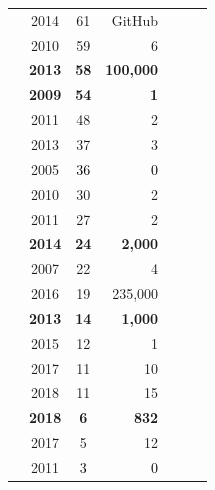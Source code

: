 \documentclass[sigconf,review]{acmart}
\newcommand{\cmark}{\ding{51}}%
\newcommand{\xmark}{\ding{55}}%
\begin{document}
\begin{table}
\begin{tabular}{r|@{~}c|@{~}c|@{~}r|@{~}c|@{~}c|@{~}c}
        \cite{lima2014coding} & 2014 &	61 & GitHub  & \xmark & \xmark & \cmark \\
        \cite{Ostrand:2010:PFP:1868328.1868357} & 2010 &	59 &	6  & \xmark & \cmark & \cmark \\
        \rowcolor{blue!10} \textbf{\cite{bissyande2013got}} & \textbf{2013} &	\textbf{58} & \textbf{100,000} & \cmark & \cmark & \xmark \\
       \rowcolor{blue!10}  \textbf{\cite{Abreu:2009:DCF:1595808.1595835}} & \textbf{2009} &	\textbf{54} &	\textbf{1}  & \xmark & \cmark & \cmark \\
        \cite{Jermakovics:2011:MVD:1984642.1984647} & 2011 &	48 &	2  & \xmark & \cmark & \cmark \\
        \cite{bell2} & 2013 &	37 &	3  & \cmark & \cmark & \cmark \\
      \rowcolor{gray!20}  {\cite{wood2005multiview}} &{2005} &	\textcolor{black}{36} &	\textcolor{black}{0} & \xmark & \xmark & \xmark \\
        \cite{Concas:2010:ESS:1945538.1972593} & 2010 &	30 &	2  & \cmark & \xmark & \xmark \\
        \cite{Bicer:2011:DPU:1987875.1987888} & 2011  &	27 &	2 & \xmark & \cmark & \xmark \\
       \rowcolor{blue!10}  \textbf{\cite{jarczyk2014github}} & \textbf{2014} &	\textbf{24} & \textbf{2,000} & \xmark & \cmark & \xmark \\
        \cite{Udaya} & 2007 &	22 &	4  & \cmark & \xmark & \xmark \\
        \cite{7539677} & 2016 &	19 &	235,000  & \cmark & \cmark & \xmark \\
       \rowcolor{blue!10}  \textbf{\cite{Peterson}} & \textbf{2013} &	\textbf{14} & \textbf{1,000} & \xmark & \cmark & \xmark \\
        \cite{Prasad} & 2015 &	12 &	1  & \cmark & \cmark & \xmark \\
        \cite{Kumar2017} & 2017 &	11 &	10  & \cmark & \cmark & \xmark \\
        \cite{jiarpakdee2018impact} & 2018 &	11 &	15  & \cmark & \cmark & \xmark \\
       \rowcolor{blue!10}  \textbf{\cite{Agrawal_2018}} & \textbf{2018} &	\textbf{6} & \textbf{832} & \xmark & \cmark & \xmark \\
        \cite{Gupta2017} & 2017 &	5 &	12   & \cmark & \xmark & \xmark \\
      \rowcolor{gray!20}  {\cite{bier2011online}} &{2011} &	\textcolor{black}{3} &	\textcolor{black}{0} & \xmark & \xmark & \xmark \\

\end{tabular}
\end{table}
\end{document}
